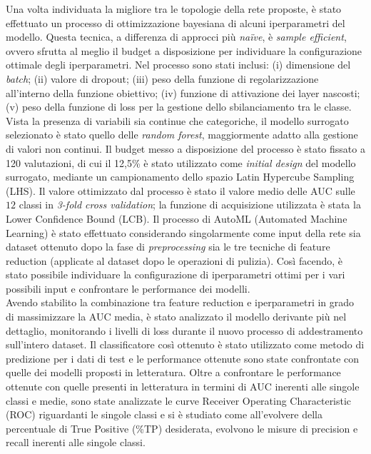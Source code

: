 Una volta individuata la migliore tra le topologie della rete proposte, è stato effettuato un processo di ottimizzazione bayesiana di alcuni iperparametri del modello. 
Questa tecnica, a differenza di approcci più \textit{na\"ive}, è \textit{sample efficient}, ovvero sfrutta al meglio il budget a disposizione per individuare la configurazione ottimale degli iperparametri. Nel processo sono stati inclusi: (i) dimensione del \textit{batch}; (ii) valore di dropout; (iii) peso della funzione di regolarizzazione all'interno della funzione obiettivo; (iv) funzione di attivazione dei layer nascosti; (v) peso della funzione di loss per la gestione dello sbilanciamento tra le classe.
Vista la presenza di variabili sia continue che categoriche, il modello surrogato selezionato è stato quello delle \textit{random forest}, maggiormente adatto alla gestione di valori non continui. 
Il budget messo a disposizione del processo è stato fissato a 120 valutazioni, di cui il 12,5\% è stato utilizzato come \textit{initial design} del modello surrogato, mediante un campionamento dello spazio Latin Hypercube Sampling (LHS). Il valore ottimizzato dal processo è stato il valore medio delle AUC sulle $12$ classi in \textit{3-fold cross validation}; la funzione di acquisizione utilizzata è stata la Lower Confidence Bound (LCB).
Il processo di AutoML (Automated Machine Learning) è stato effettuato considerando singolarmente come input della rete sia dataset ottenuto dopo la fase di \textit{preprocessing} sia le tre tecniche di feature reduction (applicate al dataset dopo le operazioni di pulizia).
Così facendo, è stato possibile individuare la configurazione di iperparametri ottimi per i vari possibili input e confrontare le performance dei modelli.\\ 
Avendo stabilito la combinazione tra feature reduction e iperparametri in grado di massimizzare la AUC media, è stato analizzato il modello derivante più nel dettaglio, monitorando i livelli di loss durante il nuovo processo di addestramento sull'intero dataset.
Il classificatore così ottenuto è stato utilizzato come metodo di predizione per i dati di test e le performance ottenute sono state confrontate con quelle dei modelli proposti in letteratura.
Oltre a confrontare le performance ottenute con quelle presenti in letteratura in termini di AUC inerenti alle singole classi e medie, sono state analizzate le curve Receiver Operating Characteristic (ROC) riguardanti le singole classi e si è studiato come all'evolvere della percentuale di True Positive (\%TP) desiderata, evolvono le misure di precision e recall inerenti alle singole classi.
